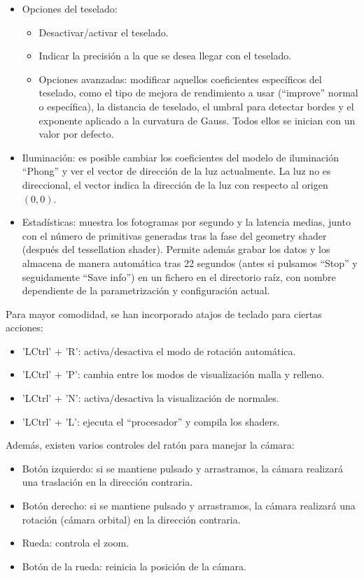 \begin{itemize}
\begin{itemize}
	\end{itemize}
	\item Opciones del teselado:
	\begin{itemize}
		\item Desactivar/activar el teselado.
		\item Indicar la precisión a la que se desea llegar con el teselado.
		\item Opciones avanzadas: modificar aquellos coeficientes específicos del teselado, como el tipo de mejora de rendimiento a usar (``improve'' normal o específica), la distancia de teselado, el umbral para detectar bordes y el exponente aplicado a la curvatura de Gauss. Todos ellos se inician con un valor por defecto.
	\end{itemize}
	\item Iluminación: es posible cambiar los coeficientes del modelo de iluminación ``Phong'' y ver el vector de dirección de la luz actualmente. La luz no es direccional, el vector indica la dirección de la luz con respecto al origen $(0,0)$.
	\item Estadísticas: muestra los fotogramas por segundo y la latencia medias, junto con el número de primitivas generadas tras la fase del geometry shader (después del tessellation shader). Permite además grabar los datos y los almacena de manera automática tras 22 segundos (antes si pulsamos ``Stop'' y seguidamente ``Save info'') en un fichero en el directorio raíz, con nombre dependiente de la parametrización y configuración actual.
\end{itemize}

Para mayor comodidad, se han incorporado atajos de teclado para ciertas acciones:
\begin{itemize}
	\item 'LCtrl' + 'R': activa/desactiva el modo de rotación automática.
	\item 'LCtrl' + 'P': cambia entre los modos de visualización malla y relleno.
	\item 'LCtrl' + 'N': activa/desactiva la visualización de normales.
	\item 'LCtrl' + 'L': ejecuta el ``procesador'' y compila los shaders.
\end{itemize}

Además, existen varios controles del ratón para manejar la cámara:
\begin{itemize}
	\item Botón izquierdo: si se mantiene pulsado y arrastramos, la cámara realizará una traslación en la dirección contraria.
	\item Botón derecho: si se mantiene pulsado y arrastramos, la cámara realizará una rotación (cámara orbital) en la dirección contraria.
	\item Rueda: controla el zoom.
	\item Botón de la rueda: reinicia la posición de la cámara.
\end{itemize}

\endinput
